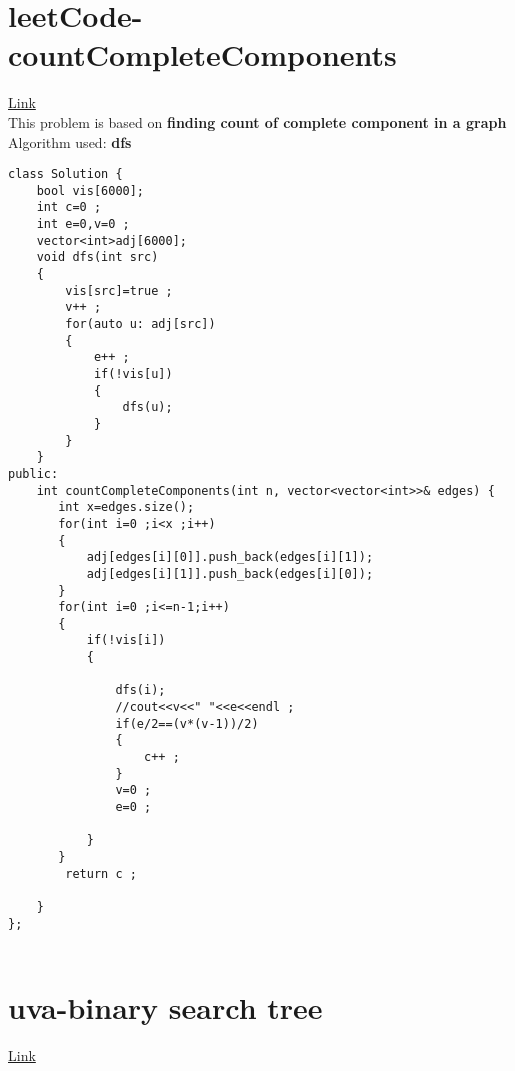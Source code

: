 \documentclass{article}
\begin{document}
\section{leetCode- countCompleteComponents} \href{https://leetcode.com/problems/count-the-number-of-complete-components/description/}{Link} \\

This problem is based on  \textbf{ finding count of complete component in a graph   }\\
Algorithm used: \textbf{dfs}\\

\begin{lstlisting}[style=cppStyle]
class Solution {
    bool vis[6000];
    int c=0 ;
    int e=0,v=0 ;
    vector<int>adj[6000];
    void dfs(int src)
    {
        vis[src]=true ;
        v++ ;
        for(auto u: adj[src])
        {
            e++ ;
            if(!vis[u])
            {
                dfs(u);
            }
        }
    }
public:
    int countCompleteComponents(int n, vector<vector<int>>& edges) {
       int x=edges.size();
       for(int i=0 ;i<x ;i++)
       {
           adj[edges[i][0]].push_back(edges[i][1]);
           adj[edges[i][1]].push_back(edges[i][0]);
       }
       for(int i=0 ;i<=n-1;i++)
       {
           if(!vis[i])
           {
              
               dfs(i);
               //cout<<v<<" "<<e<<endl ;
               if(e/2==(v*(v-1))/2)
               {
                   c++ ;
               }
               v=0 ;
               e=0 ;
               
           }
       }
        return c ;
        
    }
};


\end{lstlisting}


\section{uva-binary search tree} \href{https://onlinejudge.org/index.php?option=com_onlinejudge&Itemid=8&page=show_problem&problem=3769}{Link} \\
\end{document}
